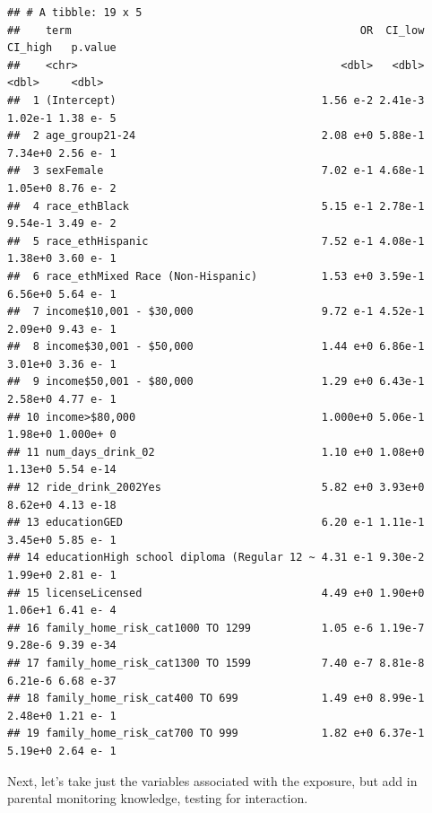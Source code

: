 \documentclass[
]{article}
\begin{document}
\begin{verbatim}
## # A tibble: 19 x 5
##    term                                             OR  CI_low CI_high   p.value
##    <chr>                                         <dbl>   <dbl>   <dbl>     <dbl>
##  1 (Intercept)                                1.56 e-2 2.41e-3 1.02e-1 1.38 e- 5
##  2 age_group21-24                             2.08 e+0 5.88e-1 7.34e+0 2.56 e- 1
##  3 sexFemale                                  7.02 e-1 4.68e-1 1.05e+0 8.76 e- 2
##  4 race_ethBlack                              5.15 e-1 2.78e-1 9.54e-1 3.49 e- 2
##  5 race_ethHispanic                           7.52 e-1 4.08e-1 1.38e+0 3.60 e- 1
##  6 race_ethMixed Race (Non-Hispanic)          1.53 e+0 3.59e-1 6.56e+0 5.64 e- 1
##  7 income$10,001 - $30,000                    9.72 e-1 4.52e-1 2.09e+0 9.43 e- 1
##  8 income$30,001 - $50,000                    1.44 e+0 6.86e-1 3.01e+0 3.36 e- 1
##  9 income$50,001 - $80,000                    1.29 e+0 6.43e-1 2.58e+0 4.77 e- 1
## 10 income>$80,000                             1.000e+0 5.06e-1 1.98e+0 1.000e+ 0
## 11 num_days_drink_02                          1.10 e+0 1.08e+0 1.13e+0 5.54 e-14
## 12 ride_drink_2002Yes                         5.82 e+0 3.93e+0 8.62e+0 4.13 e-18
## 13 educationGED                               6.20 e-1 1.11e-1 3.45e+0 5.85 e- 1
## 14 educationHigh school diploma (Regular 12 ~ 4.31 e-1 9.30e-2 1.99e+0 2.81 e- 1
## 15 licenseLicensed                            4.49 e+0 1.90e+0 1.06e+1 6.41 e- 4
## 16 family_home_risk_cat1000 TO 1299           1.05 e-6 1.19e-7 9.28e-6 9.39 e-34
## 17 family_home_risk_cat1300 TO 1599           7.40 e-7 8.81e-8 6.21e-6 6.68 e-37
## 18 family_home_risk_cat400 TO 699             1.49 e+0 8.99e-1 2.48e+0 1.21 e- 1
## 19 family_home_risk_cat700 TO 999             1.82 e+0 6.37e-1 5.19e+0 2.64 e- 1
\end{verbatim}

Next, let's take just the variables associated with the exposure, but
add in parental monitoring knowledge, testing for interaction.
\end{document}
